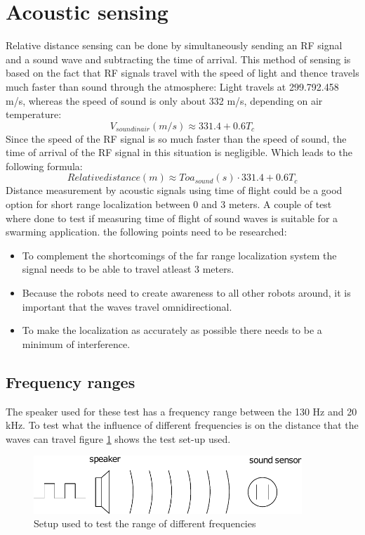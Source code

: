 \documentclass[10pt,a4paper]{article}
\begin{document}
\section{Acoustic sensing}
Relative distance sensing can be done by simultaneously sending an RF signal and a sound wave and subtracting the time of arrival.
This method of sensing is based on the fact that RF signals travel with the speed of light and thence travels much faster than sound through the atmosphere: Light travels at 299.792.458 m/s, whereas the speed of sound is only about 332 m/s, depending on air temperature:
\begin{equation}
\label{eq:speedsoundinair}
V_{sound in air}(m/s)\approx 331.4+0.6T_{c}
\end{equation}
Since the speed of the RF signal is so much faster than the speed of sound, the time of arrival of the RF signal in this situation is negligible. Which leads to the following formula:
\begin{equation}
Relative distance(m) \approx Toa_{sound}(s)\cdot  331.4+0.6T_{c}
\end{equation}
Distance measurement by acoustic signals using time of flight could be a good option for short range localization between 0 and 3 meters. A couple of test where done to test if measuring time of flight of sound waves is suitable for a swarming application. the following points need to be researched:
\begin{itemize}
\item To complement the shortcomings of the far range localization system the signal needs to be able to travel atleast 3 meters.
\item Because the robots need to create awareness to all other robots around, it is important that the waves travel omnidirectional. 
\item To make the localization as accurately as possible there needs to be a minimum of interference. 
\end{itemize}

\subsection{Frequency ranges}
The speaker used for these test has a frequency range between the 130 Hz and 20 kHz. To test what the influence of different frequencies is on the distance that the waves can travel figure \ref{setup1} shows the test set-up used.

\begin{figure}[H]
\centering
\includegraphics[width=0.9\textwidth]{situation1.pdf}
\caption{Setup used to test the range of different frequencies} 
\label{setup1}
\end{figure}
\end{document}
